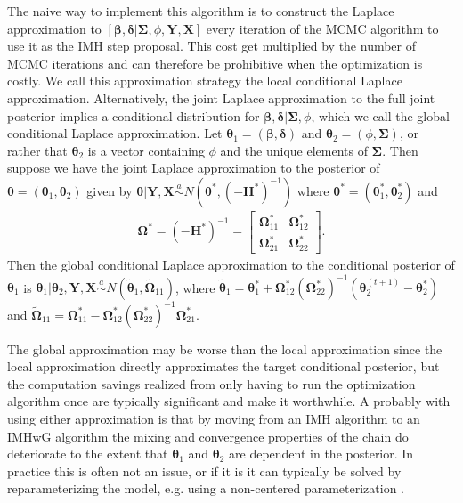 \documentclass[12pt]{article}
\begin{document}
The naive way to implement this algorithm is to construct the Laplace approximation to $[\bm{\beta},\bm{\delta}|\bm{\Sigma},\phi,\bm{Y},\bm{X}]$ every iteration of the MCMC algorithm to use it as the IMH step proposal. This cost get multiplied by the number of MCMC iterations and can therefore be prohibitive when the optimization is costly. We call this approximation strategy the local conditional Laplace approximation. Alternatively, the joint Laplace approximation to the full joint posterior implies a conditional distribution for $\bm{\beta}, \bm{\delta}|\bm{\Sigma},\phi$, which we call the global conditional Laplace approximation. Let $\bm{\theta}_1 = (\bm{\beta}, \bm{\delta})$ and $\bm{\theta}_2 = (\phi, \bm{\Sigma})$, or rather that $\bm{\theta}_2$ is a vector containing $\phi$ and the unique elements of $\bm{\Sigma}$. Then suppose we have the joint Laplace approximation to the posterior of $\bm{\theta} = (\bm{\theta}_1, \bm{\theta}_2)$ given by $\bm{\theta}|\bm{Y},\bm{X} \stackrel{a}{\sim} N(\bm{\theta}^*, (-\bm{H}^*)^{-1})$ where $\bm{\theta}^* = (\bm{\theta}^*_1, \bm{\theta}_2^*)$ and 
\begin{align*}
\bm{\Omega}^* = (-\bm{H}^*)^{-1} = \begin{bmatrix} \bm{\Omega}^*_{11} & \bm{\Omega}^*_{12} \\ \bm{\Omega}^*_{21} & \bm{\Omega}^*_{22} \end{bmatrix}.
\end{align*}
Then the global conditional Laplace approximation to the conditional posterior of $\bm{\theta}_1$ is $\bm{\theta}_1|\bm{\theta}_2,\bm{Y},\bm{X} \stackrel{a}{\sim} N(\widetilde{\bm{\theta}}_1, \widetilde{\bm{\Omega}}_{11})$, where $\widetilde{\bm{\theta}}_1 = \bm{\theta}_1^* + \bm{\Omega}_{12}^*(\bm{\Omega}_{22}^*)^{-1}(\bm{\theta}_2^{(t+1)} - \bm{\theta}_2^*)$ and $\widetilde{\bm{\Omega}}_{11} = \bm{\Omega}_{11}^* - \bm{\Omega}_{12}^*(\bm{\Omega}_{22}^*)^{-1}\bm{\Omega}_{21}^*$.

The global approximation may be worse than the local approximation since the local approximation directly approximates the target conditional posterior, but the computation savings realized from only having to run the optimization algorithm once are typically significant and make it worthwhile. A probably with using either approximation is that by moving from an IMH algorithm to an IMHwG algorithm the mixing and convergence properties of the chain do deteriorate to the extent that $\bm{\theta}_1$ and $\bm{\theta}_2$ are dependent in the posterior. In practice this is often not an issue, or if it is it can typically be solved by reparameterizing the model, e.g. using a non-centered parameterization \citep{gelfand1995efficient,roberts1997updating,van2001art,bernardo2003non}.
\end{document}
